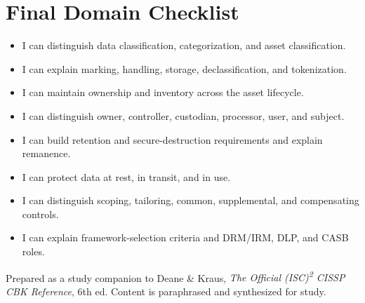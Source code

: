 \documentclass[10pt,letterpaper]{article}
\begin{document}
\section{Final Domain Checklist}
{\small
\begin{itemize}[label=\(\square\),nosep]
\item I can distinguish data classification, categorization, and asset classification.
\item I can explain marking, handling, storage, declassification, and tokenization.
\item I can maintain ownership and inventory across the asset lifecycle.
\item I can distinguish owner, controller, custodian, processor, user, and subject.
\item I can build retention and secure-destruction requirements and explain remanence.
\item I can protect data at rest, in transit, and in use.
\item I can distinguish scoping, tailoring, common, supplemental, and compensating controls.
\item I can explain framework-selection criteria and DRM/IRM, DLP, and CASB roles.
\end{itemize}
}
\vfill
{\footnotesize\color{Teal}Prepared as a study companion to Deane \& Kraus, \textit{The Official (ISC)\textsuperscript{2} CISSP CBK Reference}, 6th ed. Content is paraphrased and synthesized for study.}
\end{document}
